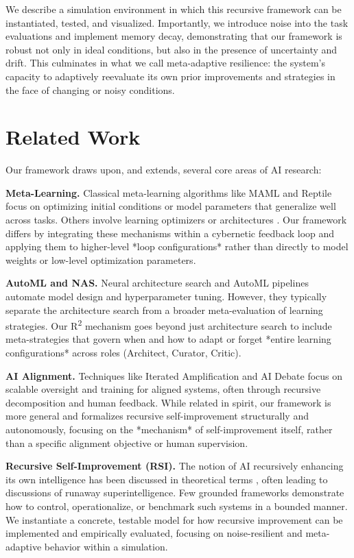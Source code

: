 \documentclass{article}
\begin{document}
We describe a simulation environment in which this recursive framework can be instantiated, tested, and visualized. Importantly, we introduce noise into the task evaluations and implement memory decay, demonstrating that our framework is robust not only in ideal conditions, but also in the presence of uncertainty and drift. This culminates in what we call meta-adaptive resilience: the system’s capacity to adaptively reevaluate its own prior improvements and strategies in the face of changing or noisy conditions.

\section{Related Work}
Our framework draws upon, and extends, several core areas of AI research:

\textbf{Meta-Learning.} Classical meta-learning algorithms like MAML \cite{finn2017maml} and Reptile \cite{nichol2018reptile} focus on optimizing initial conditions or model parameters that generalize well across tasks. Others involve learning optimizers or architectures \cite{andrychowicz2016learning, ha2016hypernetworks}. Our framework differs by integrating these mechanisms within a cybernetic feedback loop and applying them to higher-level *loop configurations* rather than directly to model weights or low-level optimization parameters.

\textbf{AutoML and NAS.} Neural architecture search \cite{zoph2016neural} and AutoML pipelines \cite{feurer2015efficient} automate model design and hyperparameter tuning. However, they typically separate the architecture search from a broader meta-evaluation of learning strategies. Our R\textsuperscript{2} mechanism goes beyond just architecture search to include meta-strategies that govern when and how to adapt or forget *entire learning configurations* across roles (Architect, Curator, Critic).

\textbf{AI Alignment.} Techniques like Iterated Amplification \cite{christiano2018supervising} and AI Debate \cite{irving2018ai} focus on scalable oversight and training for aligned systems, often through recursive decomposition and human feedback. While related in spirit, our framework is more general and formalizes recursive self-improvement structurally and autonomously, focusing on the *mechanism* of self-improvement itself, rather than a specific alignment objective or human supervision.

\textbf{Recursive Self-Improvement (RSI).} The notion of AI recursively enhancing its own intelligence has been discussed in theoretical terms \cite{bostrom2014superintelligence}, often leading to discussions of runaway superintelligence. Few grounded frameworks demonstrate how to control, operationalize, or benchmark such systems in a bounded manner. We instantiate a concrete, testable model for how recursive improvement can be implemented and empirically evaluated, focusing on noise-resilient and meta-adaptive behavior within a simulation.
\end{document}
